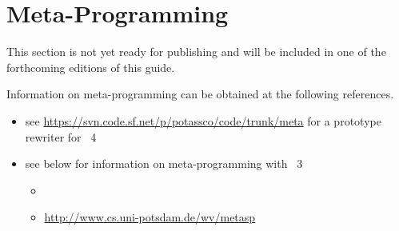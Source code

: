 \section{Meta-Programming}\label{sec:meta}

This section is not yet ready for publishing
and will be included in one of the forthcoming editions of this guide.

Information on meta-programming can be obtained at the following references.

\begin{itemize}
\item see \url{https://svn.code.sf.net/p/potassco/code/trunk/meta} for a prototype rewriter for \gringo\ 4
\item see below for information on meta-programming with \gringo~3
  \begin{itemize}
  \item \cite{gekasc11b}
  \item \url{http://www.cs.uni-potsdam.de/wv/metasp}
  \end{itemize}
\end{itemize}

